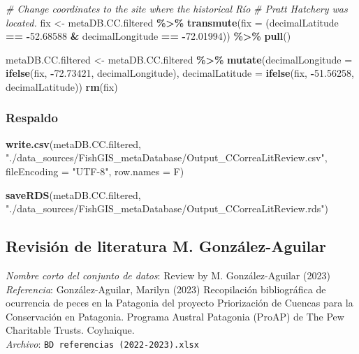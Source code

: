 \documentclass[sn-apa,pdflatex]{sn-jnl}
\newenvironment{Shaded}{\begin{snugshade}}{\end{snugshade}}
\newcommand{\AttributeTok}[1]{\textcolor[rgb]{0.13,0.29,0.53}{#1}}
\newcommand{\CommentTok}[1]{\textcolor[rgb]{0.56,0.35,0.01}{\textit{#1}}}
\newcommand{\FloatTok}[1]{\textcolor[rgb]{0.00,0.00,0.81}{#1}}
\newcommand{\FunctionTok}[1]{\textcolor[rgb]{0.13,0.29,0.53}{\textbf{#1}}}
\newcommand{\NormalTok}[1]{#1}
\newcommand{\OtherTok}[1]{\textcolor[rgb]{0.56,0.35,0.01}{#1}}
\newcommand{\SpecialCharTok}[1]{\textcolor[rgb]{0.81,0.36,0.00}{\textbf{#1}}}
\newcommand{\StringTok}[1]{\textcolor[rgb]{0.31,0.60,0.02}{#1}}
\begin{document}
\begin{Shaded}
\begin{Highlighting}[]
\CommentTok{\# Change coordinates to the site where the historical Río}
\CommentTok{\# Pratt Hatchery was located.}
\NormalTok{fix }\OtherTok{\textless{}{-}}\NormalTok{ metaDB.CC.filtered }\SpecialCharTok{\%\textgreater{}\%}
    \FunctionTok{transmute}\NormalTok{(}\AttributeTok{fix =}\NormalTok{ (decimalLatitude }\SpecialCharTok{==} \SpecialCharTok{{-}}\FloatTok{52.68588} \SpecialCharTok{\&}\NormalTok{ decimalLongitude }\SpecialCharTok{==}
        \SpecialCharTok{{-}}\FloatTok{72.01994}\NormalTok{)) }\SpecialCharTok{\%\textgreater{}\%}
    \FunctionTok{pull}\NormalTok{()}

\NormalTok{metaDB.CC.filtered }\OtherTok{\textless{}{-}}\NormalTok{ metaDB.CC.filtered }\SpecialCharTok{\%\textgreater{}\%}
    \FunctionTok{mutate}\NormalTok{(}\AttributeTok{decimalLongitude =} \FunctionTok{ifelse}\NormalTok{(fix, }\SpecialCharTok{{-}}\FloatTok{72.73421}\NormalTok{, decimalLongitude),}
        \AttributeTok{decimalLatitude =} \FunctionTok{ifelse}\NormalTok{(fix, }\SpecialCharTok{{-}}\FloatTok{51.56258}\NormalTok{, decimalLatitude))}
\FunctionTok{rm}\NormalTok{(fix)}
\end{Highlighting}
\end{Shaded}

\subsubsection{Respaldo}\label{respaldo-1}

\begin{Shaded}
\begin{Highlighting}[]
\FunctionTok{write.csv}\NormalTok{(metaDB.CC.filtered, }\StringTok{"./data\_sources/FishGIS\_metaDatabase/Output\_CCorreaLitReview.csv"}\NormalTok{,}
    \AttributeTok{fileEncoding =} \StringTok{"UTF{-}8"}\NormalTok{, }\AttributeTok{row.names =}\NormalTok{ F)}

\FunctionTok{saveRDS}\NormalTok{(metaDB.CC.filtered, }\StringTok{"./data\_sources/FishGIS\_metaDatabase/Output\_CCorreaLitReview.rds"}\NormalTok{)}
\end{Highlighting}
\end{Shaded}

\subsection{Revisión de literatura M.
González-Aguilar}\label{revisiuxf3n-de-literatura-m.-gonzuxe1lez-aguilar}

\emph{Nombre corto del conjunto de datos}: Review by M. González-Aguilar
(2023)\\
\emph{Referencia}: González-Aguilar, Marilyn (2023) Recopilación
bibliográfica de ocurrencia de peces en la Patagonia del proyecto
Priorización de Cuencas para la Conservación en Patagonia. Programa
Austral Patagonia (ProAP) de The Pew Charitable Trusts. Coyhaique.
\citep{Aguilar2023}\\
\emph{Archivo}: \texttt{BD\ referencias\ (2022-2023).xlsx}
\end{document}
